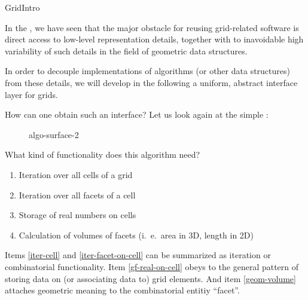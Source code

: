 
\begin{Label}{GridIntro}
\end{Label} 

  In the ,
  we have seen that the major obstacle for reusing grid-related software
  is direct access to low-level representation details,
  together with to inavoidable high variability of such details
  in the field of geometric data structures.

  In order to  decouple implementations of algorithms 
  (or other data structures)
  from these details, we will develop in the following 
  a uniform, abstract interface layer for grids.

  How can one obtain such an interface? 
  Let us look again at the simple 
  :

   \begin{figure}[h]
     \begin{center}
       \begin{Label}{algo-surface-2}
       \T
       \W{}
        \end{Label}
     \end{center}
   \end{figure}

   What kind of functionality does this algorithm need?
   \begin{enumerate}
   \item \label{iter-cell} Iteration over all cells of a grid
   \item \label{iter-facet-on-cell} Iteration over all facets of a cell
   \item \label{gf-real-on-cell} Storage of real numbers on cells
   \item \label{geom-volume} Calculation of volumes of  facets 
     (i.\ e.\ area in 3D, length in 2D)
   \end{enumerate}
  
   Items \ref{iter-cell} and \ref{iter-facet-on-cell} 
   can be summarized as iteration or combinatorial functionality.
   Item \ref{gf-real-on-cell} obeys to the general pattern of storing
   data on (or associating data to) grid elements.
   And item \ref{geom-volume} attaches geometric meaning to the combinatorial
   entitiy ``facet''.


